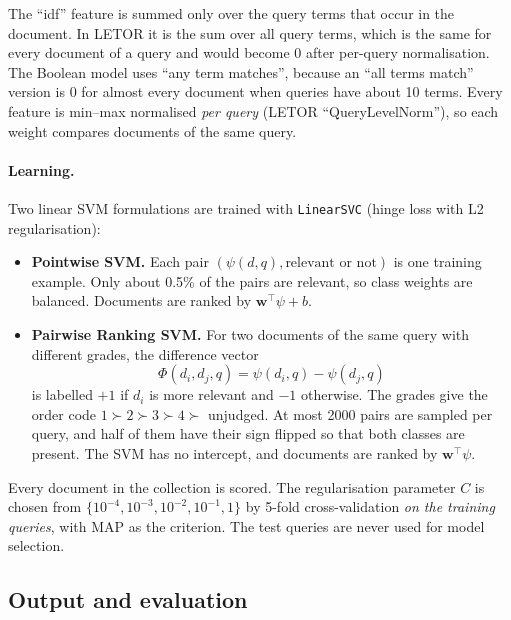 \documentclass[11pt,a4paper]{article}
\newcommand{\code}[1]{\texttt{#1}}
\begin{document}
The ``idf'' feature is summed only over the query terms that occur in the document. In LETOR
it is the sum over all query terms, which is the same for every document of a query and would
become 0 after per-query normalisation. The Boolean model uses ``any term matches'', because
an ``all terms match'' version is 0 for almost every document when queries have about 10
terms. Every feature is min--max normalised \emph{per query} (LETOR ``QueryLevelNorm''), so
each weight compares documents of the same query.

\paragraph{Learning.} Two linear SVM formulations are trained with \code{LinearSVC} (hinge
loss with L2 regularisation):
\begin{itemize}
  \item \textbf{Pointwise SVM.} Each pair $(\psi(d,q), \text{relevant or not})$ is one
  training example. Only about 0.5\% of the pairs are relevant, so class weights are
  balanced. Documents are ranked by $\mathbf{w}^\top\psi + b$.
  \item \textbf{Pairwise Ranking SVM.} For two documents of the same query with different
  grades, the difference vector
  \begin{equation}
    \Phi(d_i,d_j,q) = \psi(d_i,q) - \psi(d_j,q)
  \end{equation}
  is labelled $+1$ if $d_i$ is more relevant and $-1$ otherwise. The grades give the order
  code $1 \succ 2 \succ 3 \succ 4 \succ$ unjudged. At most 2000 pairs are sampled per query,
  and half of them have their sign flipped so that both classes are present. The SVM has no
  intercept, and documents are ranked by $\mathbf{w}^\top\psi$.
\end{itemize}
Every document in the collection is scored. The regularisation parameter $C$ is chosen from
$\{10^{-4}, 10^{-3}, 10^{-2}, 10^{-1}, 1\}$ by 5-fold cross-validation \emph{on the training
queries}, with MAP as the criterion. The test queries are never used for model selection.

\subsection{Output and evaluation}
\end{document}
